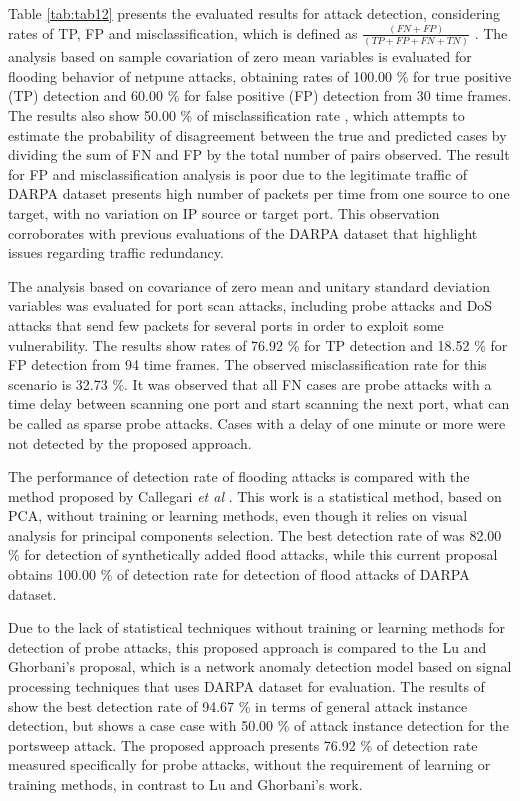 Table \ref{tab:tab12} presents the evaluated results for attack detection, considering rates of TP, FP \cite{fleiss2013statistical} and misclassification, which is defined as $\frac{(FN+FP)}{(TP+FP+FN+TN)}$ \cite{bhuyan2014network}. The analysis based on sample covariation of zero mean variables is evaluated for flooding behavior of netpune attacks, obtaining rates of 100.00 \% for true positive (TP) detection and 60.00 \% for false positive (FP) detection from 30 time frames. The results also show 50.00 \% of misclassification rate , which attempts to estimate the probability of disagreement between the true and predicted cases by dividing the sum of FN and FP by the total number of pairs observed. 
The result for FP and misclassification analysis is poor due to the legitimate traffic of DARPA dataset presents high number of packets per time  from one source to one target, with no variation on IP source or target port. This observation corroborates with previous evaluations of the DARPA dataset that highlight issues regarding traffic redundancy. 

The analysis based on covariance of zero mean and unitary standard deviation variables was evaluated for port scan attacks, including probe attacks and DoS attacks that send few packets for several ports in order to exploit some vulnerability. The results show rates of 76.92 \% for TP detection and 18.52 \% for FP detection from 94 time frames. The observed misclassification rate for this scenario is 32.73 \%. It was observed that all FN cases are probe attacks with a time delay between scanning one port and start scanning the next port, what can be called as sparse probe attacks. Cases with a delay of one minute or more were not detected by the proposed approach.

The performance of detection rate of flooding attacks is compared with the method proposed by Callegari \emph{et al} \cite{Zonglin2009}. This work is a statistical method, based on PCA, without training or learning methods, even though it relies on visual analysis for principal components selection. The best detection rate of \cite{Zonglin2009} was 82.00 \% for detection of synthetically added flood attacks, while this current proposal obtains 100.00 \% of detection rate for detection of flood attacks of DARPA dataset.

Due to the lack of statistical techniques without training or learning methods for detection of probe attacks, this proposed approach is compared to the Lu and Ghorbani's \cite{Lu2009} proposal, which is a network anomaly detection model based on signal processing techniques that uses DARPA dataset for evaluation. The results of \cite{Lu2009} show the best detection rate of 94.67 \% in terms of general attack instance detection, but shows a case case with 50.00 \% of attack instance detection for the portsweep attack. The proposed approach presents 76.92 \% of detection rate measured specifically for probe attacks, without the requirement of learning or training methods, in contrast to Lu and Ghorbani's \cite{Lu2009} work.


